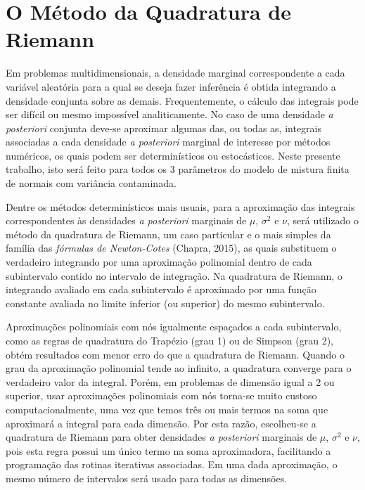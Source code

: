 \section{O Método da Quadratura de Riemann}\label{quarie}

Em problemas multidimensionais, a densidade marginal correspondente a cada variável aleatória para a qual se deseja fazer inferência é obtida integrando a densidade conjunta sobre as demais. Frequentemente, o cálculo das integrais pode ser difícil ou mesmo impossível analiticamente. No caso de uma densidade \textit{a posteriori} conjunta deve-se aproximar algumas das, ou todas as, integrais associadas a cada densidade \textit{a posteriori} marginal de interesse por métodos numéricos, os quais podem ser determinísticos ou estocásticos. Neste presente trabalho, isto será feito para todos os 3 parâmetros do modelo de mistura finita de normais com variância contaminada.

Dentre os métodos determinísticos mais usuais, para a aproximação das integrais correspondentes às densidades \textit{a posteriori} marginais de $\mu$, $\sigma^2$ e $\nu$, será utilizado o método da quadratura de Riemann, um caso particular e o mais simples da família das \textit{fórmulas de Newton-Cotes} (Chapra, 2015)\cite{Chapra2015}, as quais substituem o verdadeiro integrando por uma aproximação polinomial dentro de cada subintervalo contido no intervalo de integração. Na quadratura de Riemann, o integrando avaliado em cada subintervalo é aproximado por uma função constante avaliada no limite inferior (ou superior) do mesmo subintervalo.

Aproximações polinomiais com nós igualmente espaçados a cada subintervalo, como as regras de quadratura do Trapézio (grau 1) ou de Simpson (grau 2), obtém resultados com menor erro do que a quadratura de Riemann. Quando o grau da aproximação polinomial tende ao infinito, a quadratura converge para o verdadeiro valor da integral. Porém, em problemas de dimensão igual a 2 ou superior, usar aproximações polinomiais com nós torna-se muito custoso computacionalmente, uma vez que temos três ou mais termos na soma que aproximará a integral para cada dimensão. Por esta razão, escolheu-se a quadratura de Riemann para obter densidades \textit{a posteriori} marginais de $\mu$, $\sigma^2$ e $\nu$, pois esta regra possui um único termo na soma aproximadora, facilitando a programação das rotinas iterativas associadas. Em uma dada aproximação, o mesmo número de intervalos será usado para todas as dimensões.

